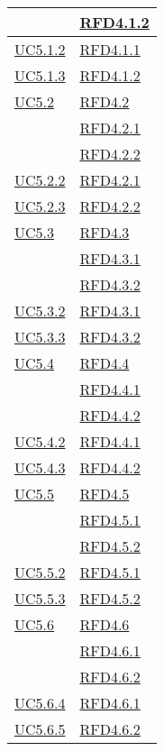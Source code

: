 \begin{longtable}{|>{\centering}m{5cm}|m{5cm}<{\centering}|}
& \hyperlink{RFD4.1.2}{RFD4.1.2}\\ \hline
\hyperref[UC5.1.2]{UC5.1.2} & \hyperlink{RFD4.1.1}{RFD4.1.1}\\ \hline
\hyperref[UC5.1.3]{UC5.1.3} & \hyperlink{RFD4.1.2}{RFD4.1.2}\\ \hline
\hyperref[UC5.2]{UC5.2} & \hyperlink{RFD4.2}{RFD4.2}\\
& \hyperlink{RFD4.2.1}{RFD4.2.1}\\
& \hyperlink{RFD4.2.2}{RFD4.2.2}\\ \hline
\hyperref[UC5.2.2]{UC5.2.2} & \hyperlink{RFD4.2.1}{RFD4.2.1}\\ \hline
\hyperref[UC5.2.3]{UC5.2.3} & \hyperlink{RFD4.2.2}{RFD4.2.2}\\ \hline
\hyperref[UC5.3]{UC5.3} & \hyperlink{RFD4.3}{RFD4.3}\\
& \hyperlink{RFD4.3.1}{RFD4.3.1}\\
& \hyperlink{RFD4.3.2}{RFD4.3.2}\\ \hline
\hyperref[UC5.3.2]{UC5.3.2} & \hyperlink{RFD4.3.1}{RFD4.3.1}\\ \hline
\hyperref[UC5.3.3]{UC5.3.3} & \hyperlink{RFD4.3.2}{RFD4.3.2}\\ \hline
\hyperref[UC5.4]{UC5.4} & \hyperlink{RFD4.4}{RFD4.4}\\
& \hyperlink{RFD4.4.1}{RFD4.4.1}\\
& \hyperlink{RFD4.4.2}{RFD4.4.2}\\ \hline
\hyperref[UC5.4.2]{UC5.4.2} & \hyperlink{RFD4.4.1}{RFD4.4.1}\\ \hline
\hyperref[UC5.4.3]{UC5.4.3} & \hyperlink{RFD4.4.2}{RFD4.4.2}\\ \hline
\hyperref[UC5.5]{UC5.5} & \hyperlink{RFD4.5}{RFD4.5}\\
& \hyperlink{RFD4.5.1}{RFD4.5.1}\\
& \hyperlink{RFD4.5.2}{RFD4.5.2}\\ \hline
\hyperref[UC5.5.2]{UC5.5.2} & \hyperlink{RFD4.5.1}{RFD4.5.1}\\ \hline
\hyperref[UC5.5.3]{UC5.5.3} & \hyperlink{RFD4.5.2}{RFD4.5.2}\\ \hline
\hyperref[UC5.6]{UC5.6} & \hyperlink{RFD4.6}{RFD4.6}\\
& \hyperlink{RFD4.6.1}{RFD4.6.1}\\
& \hyperlink{RFD4.6.2}{RFD4.6.2}\\ \hline
\hyperref[UC5.6.4]{UC5.6.4} & \hyperlink{RFD4.6.1}{RFD4.6.1}\\ \hline
\hyperref[UC5.6.5]{UC5.6.5} & \hyperlink{RFD4.6.2}{RFD4.6.2}\\ \hline

\end{longtable}
